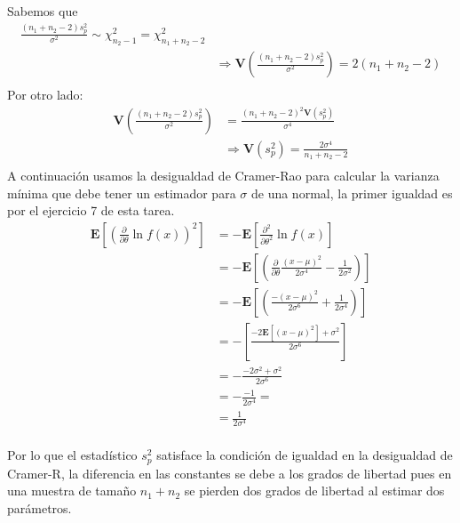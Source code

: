 \documentclass[letter]{memoir} %
\begin{document}
\begin{enumerate}
\begin{enumerate}
Sabemos que 
\begin{equation}
\begin{split}
\frac{ (n_1+n_2-2)s_p^2}{\sigma^2} \sim \chi_{n_2-1}^2 = \chi_{n_1 + n_2-2}^2 & \\
& \Rightarrow \mathbf{V}\left( \frac{ (n_1+n_2-2)s_p^2}{\sigma^2} \right) = 2(n_1+n_2-2)\\
\end{split}
\end{equation}
Por otro lado:
\begin{equation}
\begin{split}
 \mathbf{V}\left( \frac{ (n_1+n_2-2)s_p^2}{\sigma^2} \right) & =
 \frac{ (n_1+n_2-2)^2\mathbf{V}(s_p^2)}{\sigma^4}   \\
 & \Rightarrow \mathbf{V}(s_p^2) = \frac{2\sigma^4}{n_1+n_2-2}  \\
\end{split}
\end{equation}
A continuación usamos la desigualdad de Cramer-Rao para calcular la varianza mínima que debe tener un estimador para $\sigma$ de una normal, la primer igualdad es por el ejercicio 7 de esta tarea.
\begin{equation*}
\begin{split}
 \mathbf{E} \left[ (\frac{\partial}{\partial \theta}\ln f(x))^2\right] & = - \mathbf{E}\left[\frac{\partial^2}{\partial \theta ^2}\ln f(x)\right] \\
 & = - \mathbf{E}\left[ \left(\frac{\partial}{\partial \theta } \frac{(x-\mu)^2}{2\sigma^4}-\frac{1}{2\sigma^2} \right) \right]\\
 & =- \mathbf{E}\left[ \left( \frac{-(x-\mu)^2}{2\sigma^6}+\frac{1}{2\sigma^4} \right) \right] \\
 & =- \left[ \frac{-2\mathbf{E}[(x-\mu)^2]+\sigma^2}{2\sigma^6}    \right] \\ 
 & =-  \frac{-2\sigma^2+\sigma^2}{2\sigma^6}     \\ 
 & =-  \frac{-1}{2\sigma^4}    =  \\ 
& =  \frac{1}{2\sigma^4}    \\ 
\end{split}
\end{equation*}

Por lo que el estadístico $s_p^2$ satisface la condición de igualdad en la desigualdad de Cramer-R, la diferencia en las constantes se debe a los grados de libertad pues en una muestra de tamaño $n_1+n_2$ se pierden dos grados de libertad al estimar dos parámetros.



\end{enumerate}

\end{enumerate}
\end{document}
